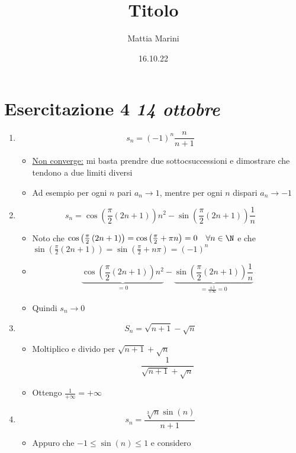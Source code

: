 \documentclass[12pt,a4paper,oneside]{article}
\title{Titolo}
\author{Mattia Marini}
\date{16.10.22}
\begin{document}
\maketitle
\tableofcontents
\listoftheorems
\listofformulas
\listofincomprensioni
\listofdefs
\newpage

\section{Esercitazione 4 \textit{14 ottobre} }
\begin{enumerate}
	\item \[
	s_n=\left( -1 \right) ^{n} \frac{n}{n+1}
	\] 
	\begin{itemize}
		\item \underline{Non converge:} mi basta prendre due sottocsuccessioni e dimostrare che tendono a due limiti diversi
		\item Ad esempio per ogni $n$ pari $a_n \to 1$, mentre per ogni $n$ dispari $ a_n \to -1$
	\end{itemize}
	\item 
	\[
	s_n = \cos\left( \frac{\pi}{2}\left( 2n +1 \right)  \right) n^2 - \sin \left( \frac{\pi}{2} \left( 2n +1 \right)  \right) \frac{1}{n}
	\] 
	\begin{itemize}
		\item Noto che $\cos\left( \frac{\pi}{2}\left( 2n+1 \right)  \right) = \cos\left( \frac{\pi}{2} + \pi n \right) = 0 \quad \forall n \in  \N$ e che $\sin\left( \frac{\pi}{2}\left( 2n +1 \right)  \right) = \sin \left( \frac{\pi}{2} + n \pi \right)= \left( -1 \right) ^{n}$
		\item \[ 
		\underbrace{\cos\left( \frac{\pi}{2}\left( 2n +1 \right)  \right) n^2}_{=0} - \underbrace{\sin \left( \frac{\pi}{2} \left( 2n +1 \right)  \right) \frac{1}{n}}_{= \frac{\pm 1}{+ \infty }= 0}
\] 
	\item Quindi $s_n \to 0$
	\end{itemize}
	\item \[
	S_n = \sqrt{n+1} - \sqrt{n} 
	\] 
	\begin{itemize}
		\item Moltiplico e divido per $\sqrt{n+1} + \sqrt{n} $ 
		\[
		\frac{1}{\sqrt{n+1} + \sqrt{n} }
		\] 
		\item Ottengo $\frac{1}{+ \infty}= +\infty$
	\end{itemize}
	\item  \[
	s_n = \frac{\sqrt[3]{n} \sin\left( n \right)}{n+1}
	\] 
	\begin{itemize}
		\item Appuro che $-1 \le \sin\left( n \right) \le 1$ e considero 

\end{itemize}
\end{enumerate}
\end{document}
